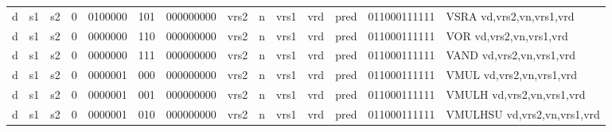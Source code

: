 \begin{landscape}
\begin{table}[p]
\begin{small}
\begin{center}
\begin{tabular}{p{0.08in}@{}p{0.08in}@{}p{0.08in}@{}p{0.08in}@{}p{0.50in}@{}p{0.30in}@{}p{0.08in}@{}p{0.8in}@{}p{0.48in}@{}p{0.32in}@{}p{0.08in}@{}p{0.8in}@{}p{0.8in}@{}p{0.4in}@{}p{0.56in}l}
\multicolumn{1}{|c|}{d} &
\multicolumn{1}{c|}{s1} &
\multicolumn{1}{c|}{s2} &
\multicolumn{1}{c|}{0} &
\multicolumn{1}{c|}{0100000} &
\multicolumn{1}{c|}{101} &
\multicolumn{2}{c|}{000000000} &
\multicolumn{2}{c|}{vrs2} &
\multicolumn{1}{c|}{n} &
\multicolumn{1}{c|}{vrs1} &
\multicolumn{1}{c|}{vrd} &
\multicolumn{1}{c|}{pred} &
\multicolumn{1}{c|}{011000111111} & VSRA vd,vrs2,vn,vrs1,vrd \\
\cline{1-15}
  

\multicolumn{1}{|c|}{d} &
\multicolumn{1}{c|}{s1} &
\multicolumn{1}{c|}{s2} &
\multicolumn{1}{c|}{0} &
\multicolumn{1}{c|}{0000000} &
\multicolumn{1}{c|}{110} &
\multicolumn{2}{c|}{000000000} &
\multicolumn{2}{c|}{vrs2} &
\multicolumn{1}{c|}{n} &
\multicolumn{1}{c|}{vrs1} &
\multicolumn{1}{c|}{vrd} &
\multicolumn{1}{c|}{pred} &
\multicolumn{1}{c|}{011000111111} & VOR vd,vrs2,vn,vrs1,vrd \\
\cline{1-15}
  

\multicolumn{1}{|c|}{d} &
\multicolumn{1}{c|}{s1} &
\multicolumn{1}{c|}{s2} &
\multicolumn{1}{c|}{0} &
\multicolumn{1}{c|}{0000000} &
\multicolumn{1}{c|}{111} &
\multicolumn{2}{c|}{000000000} &
\multicolumn{2}{c|}{vrs2} &
\multicolumn{1}{c|}{n} &
\multicolumn{1}{c|}{vrs1} &
\multicolumn{1}{c|}{vrd} &
\multicolumn{1}{c|}{pred} &
\multicolumn{1}{c|}{011000111111} & VAND vd,vrs2,vn,vrs1,vrd \\
\cline{1-15}
  

\multicolumn{1}{|c|}{d} &
\multicolumn{1}{c|}{s1} &
\multicolumn{1}{c|}{s2} &
\multicolumn{1}{c|}{0} &
\multicolumn{1}{c|}{0000001} &
\multicolumn{1}{c|}{000} &
\multicolumn{2}{c|}{000000000} &
\multicolumn{2}{c|}{vrs2} &
\multicolumn{1}{c|}{n} &
\multicolumn{1}{c|}{vrs1} &
\multicolumn{1}{c|}{vrd} &
\multicolumn{1}{c|}{pred} &
\multicolumn{1}{c|}{011000111111} & VMUL vd,vrs2,vn,vrs1,vrd \\
\cline{1-15}
  

\multicolumn{1}{|c|}{d} &
\multicolumn{1}{c|}{s1} &
\multicolumn{1}{c|}{s2} &
\multicolumn{1}{c|}{0} &
\multicolumn{1}{c|}{0000001} &
\multicolumn{1}{c|}{001} &
\multicolumn{2}{c|}{000000000} &
\multicolumn{2}{c|}{vrs2} &
\multicolumn{1}{c|}{n} &
\multicolumn{1}{c|}{vrs1} &
\multicolumn{1}{c|}{vrd} &
\multicolumn{1}{c|}{pred} &
\multicolumn{1}{c|}{011000111111} & VMULH vd,vrs2,vn,vrs1,vrd \\
\cline{1-15}
  

\multicolumn{1}{|c|}{d} &
\multicolumn{1}{c|}{s1} &
\multicolumn{1}{c|}{s2} &
\multicolumn{1}{c|}{0} &
\multicolumn{1}{c|}{0000001} &
\multicolumn{1}{c|}{010} &
\multicolumn{2}{c|}{000000000} &
\multicolumn{2}{c|}{vrs2} &
\multicolumn{1}{c|}{n} &
\multicolumn{1}{c|}{vrs1} &
\multicolumn{1}{c|}{vrd} &
\multicolumn{1}{c|}{pred} &
\multicolumn{1}{c|}{011000111111} & VMULHSU vd,vrs2,vn,vrs1,vrd \\
\cline{1-15}
  


\end{tabular}
\end{center}
\end{small}
\end{table}
\end{landscape}
